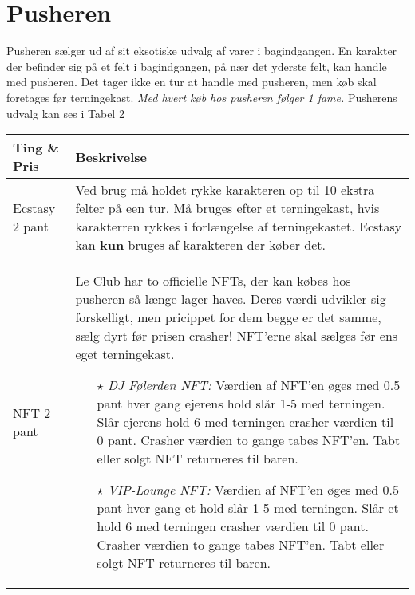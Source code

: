 
\section{Pusheren}
Pusheren sælger ud af sit eksotiske udvalg af varer i bagindgangen. En karakter der befinder sig på et felt i bagindgangen, på nær det yderste felt, kan handle med pusheren. Det tager ikke en tur at handle med pusheren, men køb skal foretages før terningekast. \textit{Med hvert køb hos pusheren følger 1 fame.}
Pusherens udvalg kan ses i Tabel 2

\begin{Figure}
\centering
\begin{tabular}{p{}|p{}}
\textbf{Ting \& Pris} & \textbf{Beskrivelse} \\\hline

Ecstasy \hspace{2cm}2 pant & Ved brug må holdet rykke karakteren op til 10 ekstra felter på een tur. Må bruges efter et terningekast, hvis karakterren rykkes i forlængelse af terningekastet. Ecstasy kan \textbf{kun} bruges af karakteren der køber det. \\\hline

NFT \hfill \hspace{2cm} \hfill 2 pant & Le Club har to officielle NFTs, der kan købes hos pusheren så længe lager haves. Deres værdi udvikler sig forskelligt, men pricippet for dem begge er det samme, sælg dyrt før prisen crasher! NFT'erne skal sælges før ens eget terningekast.
\begin{itemize}
\item[$\star$] \textit{DJ Følerden NFT:} \newline Værdien af NFT'en øges med 0.5 pant hver gang ejerens hold slår 1-5 med terningen. Slår ejerens hold 6 med terningen crasher værdien til 0 pant. Crasher værdien to gange tabes NFT'en. Tabt eller solgt NFT returneres til baren.
\item[$\star$] \textit{VIP-Lounge NFT:} \newline Værdien af NFT'en øges med 0.5 pant hver gang et hold slår 1-5 med terningen. Slår et hold 6 med terningen crasher værdien til 0 pant. Crasher værdien to gange tabes NFT'en. Tabt eller solgt NFT returneres til baren.
\end{itemize}
  

\end{tabular}
\label{tabp}
\end{Figure}